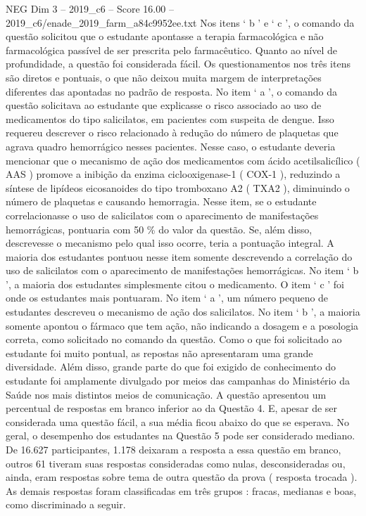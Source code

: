 \begin{textsample}{NEG Dim 3 – 2019\_c6 – Score 16.00 – 2019\_c6/enade\_2019\_farm\_a84c9952ee.txt}
Nos itens ‘ b ’ e ‘ c ’, o comando da questão solicitou que o estudante apontasse a terapia farmacológica e não farmacológica passível de ser prescrita pelo farmacêutico.
Quanto ao nível de profundidade, a questão foi considerada fácil.
Os questionamentos nos três itens são diretos e pontuais, o que não deixou muita margem de interpretações diferentes das apontadas no padrão de resposta.
No item ‘ a ’, o comando da questão solicitava ao estudante que explicasse o risco associado ao uso de medicamentos do tipo salicilatos, em pacientes com suspeita de dengue.
Isso requereu descrever o risco relacionado à redução do número de plaquetas que agrava quadro hemorrágico nesses pacientes.
Nesse caso, o estudante deveria mencionar que o mecanismo de ação dos medicamentos com ácido acetilsalicílico ( AAS ) promove a inibição da enzima ciclooxigenase-1 ( COX-1 ), reduzindo a síntese de lipídeos eicosanoides do tipo tromboxano A2 ( TXA2 ), diminuindo o número de plaquetas e causando hemorragia.
Nesse item, se o estudante correlacionasse o uso de salicilatos com o aparecimento de manifestações hemorrágicas, pontuaria com 50 \% do valor da questão.
Se, além disso, descrevesse o mecanismo pelo qual isso ocorre, teria a pontuação integral.
A maioria dos estudantes pontuou nesse item somente descrevendo a correlação do uso de salicilatos com o aparecimento de manifestações hemorrágicas.
No item ‘ b ’, a maioria dos estudantes simplesmente citou o medicamento.
O item ‘ c ’ foi onde os estudantes mais pontuaram.
No item ‘ a ’, um número pequeno de estudantes descreveu o mecanismo de ação dos salicilatos.
No item ‘ b ’, a maioria somente apontou o fármaco que tem ação, não indicando a dosagem e a posologia correta, como solicitado no comando da questão.
Como o que foi solicitado ao estudante foi muito pontual, as repostas não apresentaram uma grande diversidade.
Além disso, grande parte do que foi exigido de conhecimento do estudante foi amplamente divulgado por meios das campanhas do Ministério da Saúde nos mais distintos meios de comunicação.
A questão apresentou um percentual de respostas em branco inferior ao da Questão 4.
E, apesar de ser considerada uma questão fácil, a sua média ficou abaixo do que se esperava.
No geral, o desempenho dos estudantes na Questão 5 pode ser considerado mediano.
De 16.627 participantes, 1.178 deixaram a resposta a essa questão em branco, outros 61 tiveram suas respostas consideradas como nulas, desconsideradas ou, ainda, eram respostas sobre tema de outra questão da prova ( resposta trocada ).
As demais respostas foram classificadas em três grupos : fracas, medianas e boas, como discriminado a seguir.

\end{textsample}
